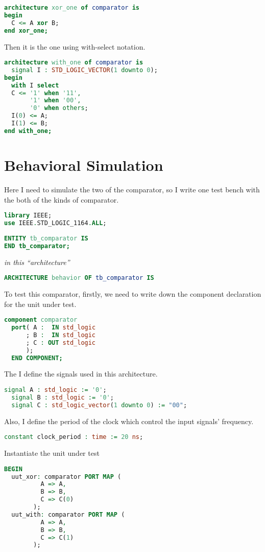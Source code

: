 \documentclass{article}
\begin{document}
\begin{lstlisting}[language=VHDL]
architecture xor_one of comparator is
begin
  C <= A xor B;
end xor_one;
\end{lstlisting}
    
    Then it is the one using with-select notation.

\begin{lstlisting}[language=VHDL]
architecture with_one of comparator is
  signal I : STD_LOGIC_VECTOR(1 downto 0);
begin
  with I select
  C <= '1' when '11',
       '1' when '00',
       '0' when others;
  I(0) <= A;
  I(1) <= B;
end with_one;
\end{lstlisting}


    \section{Behavioral Simulation}
    \label{sec:behavioralsimulation}

    Here I need to simulate the two of the comparator, so I write one test bench with the both of the kinds of comparator.

\begin{lstlisting}[language=VHDL]
library IEEE;
use IEEE.STD_LOGIC_1164.ALL;
 
ENTITY tb_comparator IS
END tb_comparator;
\end{lstlisting}

    \textit{in this ``architecture''}
\begin{lstlisting}[language=VHDL]
ARCHITECTURE behavior OF tb_comparator IS 
\end{lstlisting}
    
    To test this comparator, firstly, we need to write down the component declaration for the unit under test.

\begin{lstlisting}[language=VHDL]
  component comparator
  port( A :  IN std_logic
      ; B :  IN std_logic
      ; C : OUT std_logic
      );
  END COMPONENT;
\end{lstlisting}

    The I define the signals used in this architecture. 

\begin{lstlisting}[language=VHDL]
  signal A : std_logic := '0';
  signal B : std_logic := '0';
  signal C : std_logic_vector(1 downto 0) := "00";
\end{lstlisting}

    Also, I define the period of the clock which control the input signals' frequency.

\begin{lstlisting}[language=VHDL]
  constant clock_period : time := 20 ns;
\end{lstlisting}

   Instantiate the unit under test

\begin{lstlisting}[language=VHDL]
BEGIN
  uut_xor: comparator PORT MAP (
          A => A,
          B => B,
          C => C(0)
        );
  uut_with: comparator PORT MAP (
          A => A,
          B => B,
          C => C(1)
        );
\end{lstlisting}
    
\end{document}
